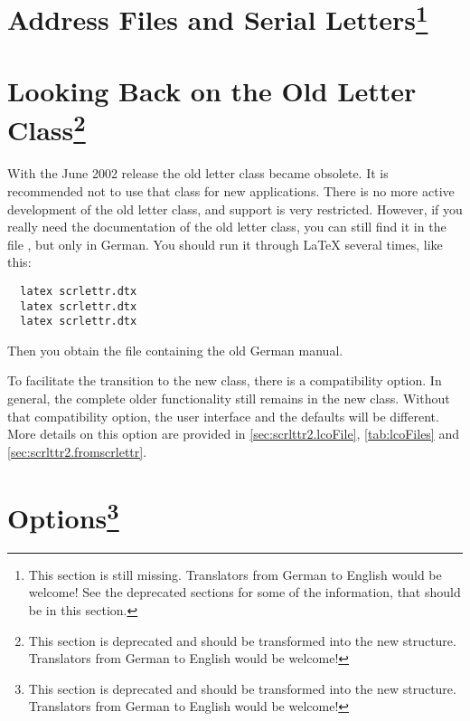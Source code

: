 \section{Address Files and Serial Letters\protect\footnote{This section is still missing. Translators
    from German to English would be welcome! See the deprecated sections for
    some of the information, that should be in this section.}}
\label{sec:scrlttr2.stillmissing}
\mbox{}


\section{Looking Back on the Old Letter Class\protect\footnote{This section is
  deprecated and should be transformed into the new structure. Translators
  from German to English would be welcome!}}
\label{sec:scrlttr2.scrlettr}

With the June 2002 release the old letter class
 became obsolete. It is
recommended not to use that class for new applications. There is no
more active development of the old letter class, and support is very
restricted. However, if you really need the documentation of the old
letter class, you can still find it in the file ,
but only in German. You should run it through {\LaTeX} several times,
like this:
\begin{lstlisting}
  latex scrlettr.dtx
  latex scrlettr.dtx
  latex scrlettr.dtx
\end{lstlisting}
Then you obtain the file  containing the old German
manual.

To facilitate the transition to the new class, there is a
compatibility option. In general, the complete older functionality
still remains in the new class.  Without that compatibility option,
the user interface and the defaults will be different. More details on
this option are provided in \autoref{sec:scrlttr2.lcoFile},
\autoref{tab:lcoFiles} and \autoref{sec:scrlttr2.fromscrlettr}.


\section{Options\protect\footnote{This section is
  deprecated and should be transformed into the new structure. Translators
  from German to English would be welcome!}}
\label{sec:scrlttr2.options}

